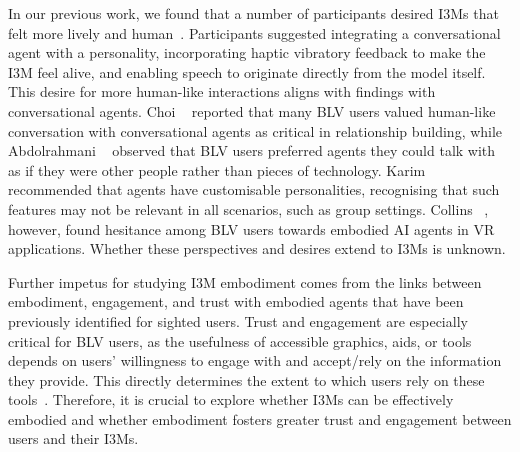 In our previous work, we found that a number of participants desired I3Ms that felt more lively and human~\cite{Reinders2023}. Participants suggested integrating a conversational agent with a personality, incorporating haptic vibratory feedback to make the I3M feel alive, and enabling speech to originate directly from the model itself. This desire for more human-like interactions aligns with findings with conversational agents. Choi \etal~\cite{Choi2020} reported that many BLV users valued human-like conversation with conversational agents as critical in relationship building, while Abdolrahmani \etal~\cite{Abdolrahmani2018} observed that BLV users preferred agents they could talk with as if they were other people rather than pieces of technology. Karim \etal~\cite{Karim2023} recommended that agents have customisable personalities, recognising that such features may not be relevant in all scenarios, such as group settings. Collins \etal~\cite{Collins2023}, however, found hesitance among BLV users towards embodied AI agents in VR applications. Whether these perspectives and desires extend to I3Ms is unknown.

Further impetus for studying I3M embodiment comes from the links between embodiment, engagement, and trust with embodied agents that have been previously identified for sighted users. Trust and engagement are especially critical for BLV users, as the usefulness of accessible graphics, aids, or tools depends on users' willingness to engage with and accept/rely on the information they provide. This directly determines the extent to which users rely on these tools~\cite{Betsy1993,Wu2017,Abdolrahmani2018}. Therefore, it is crucial to explore whether I3Ms can be effectively embodied and whether embodiment fosters greater trust and engagement between users and their I3Ms.